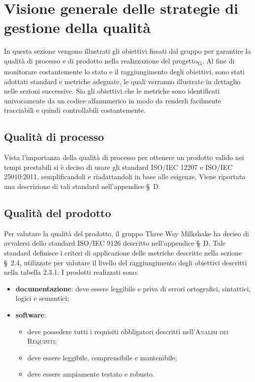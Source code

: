 \section{Visione generale delle strategie di gestione della qualità}
In questa sezione vengono illustrati gli obiettivi fissati dal gruppo per garantire la qualità di processo e di prodotto nella realizzazione del progetto\textsubscript{G}.
Al fine di monitorare costantemente lo stato e il raggiungimento degli obiettivi, sono stati adottati standard e metriche adeguate, le quali verranno illustrate in dettaglio nelle sezioni successive.
Sia gli obiettivi che le metriche sono identificati univocamente da un codice alfanumerico in modo da renderli facilmente tracciabili e quindi controllabili costantemente.

\subsection{Qualità di processo}
Vista l’importanza della qualità di processo per ottenere un prodotto valido nei tempi prestabili si è deciso di usare gli standard ISO/IEC 12207 e ISO/IEC 25010:2011, semplificandoli e riadattandoli in base alle esigenze. Viene riportata una descrizione di tali standard nell'appendice \S\ D.

\subsection{Qualità del prodotto}
Per valutare la qualità del prodotto, il gruppo Three Way Milkshake ha deciso di avvalersi dello standard ISO/IEC 9126 descritto nell'appendice \S\ D. Tale standard definisce i criteri di applicazione delle metriche descritte nella sezione \S\ 2.4, utilizzate per valutare il livello del raggiungimento degli obiettivi descritti nella tabella 2.3.1.
I prodotti realizzati sono:
\begin{itemize}
    \item \textbf{documentazione}: deve essere leggibile e priva di errori ortografici, sintattici, logici e semantici;
    \item \textbf{software}: 
    \begin{itemize}
        \item deve possedere tutti i requisiti obbligatori descritti nell'\textsc{Analisi dei Requisiti};
        \item deve essere leggibile, comprensibile e mantenibile;
        \item deve essere ampiamente testato e robusto.
    \end{itemize}
\end{itemize}

